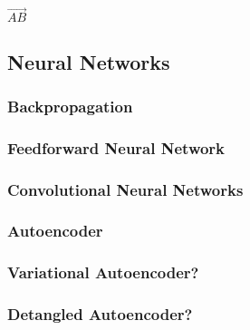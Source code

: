 \documentclass[../main]{subfiles}
\begin{document}
$\vec{AB}$

\subsection{Neural Networks}
\subsubsection{Backpropagation}
\subsubsection{Feedforward Neural Network}
\subsubsection{Convolutional Neural Networks}
\subsubsection{Autoencoder}
\subsubsection{Variational Autoencoder?}
\subsubsection{Detangled Autoencoder?}
\end{document}
